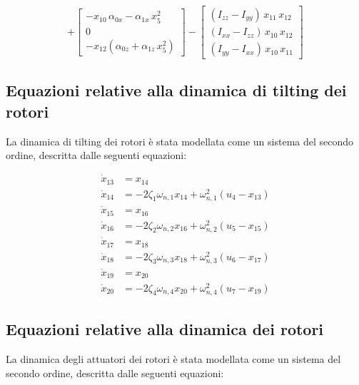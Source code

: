 \begin{equation}
+
\begin{bmatrix}
	- x_{10}\,\alpha_{0x} - \alpha_{1x}\,x_5^2 \\
	0 \\
	- x_{12}\left(\alpha_{0z} + \alpha_{1z}\,x_5^2\right)
\end{bmatrix}
-
\begin{bmatrix}
	(I_{zz}-I_{yy})\,x_{11}\,x_{12} \\
	(I_{xx}-I_{zz})\,x_{10}\,x_{12} \\
	(I_{yy}-I_{xx})\,x_{10}\,x_{11}
\end{bmatrix}
\end{equation}
	 

	  
\clearpage

\subsection{Equazioni relative alla dinamica di tilting dei rotori}
	\vspace{0.5cm}
La dinamica di tilting dei rotori è stata modellata come un sistema del secondo ordine, descritta dalle seguenti equazioni:

	\vspace{0.5cm}

\begin{align}
\dot{x}_{13} &= x_{14} \\[4pt]
\dot{x}_{14} &= -2 \zeta_1 \omega_{n,1} x_{14} + \omega_{n,1}^2 (u_4 - x_{13}) \\[6pt]
\dot{x}_{15} &= x_{16} \\[4pt]
\dot{x}_{16} &= -2 \zeta_2 \omega_{n,2} x_{16} + \omega_{n,2}^2 (u_5 - x_{15}) \\[6pt]
\dot{x}_{17} &= x_{18} \\[4pt]
\dot{x}_{18} &= -2 \zeta_3 \omega_{n,3} x_{18} + \omega_{n,3}^2 (u_6 - x_{17}) \\[6pt]
\dot{x}_{19} &= x_{20} \\[4pt]
\dot{x}_{20} &= -2 \zeta_4 \omega_{n,4} x_{20} + \omega_{n,4}^2 (u_7 - x_{19})
\end{align}
	  
\clearpage

	  
\subsection{Equazioni relative alla dinamica dei rotori}
\vspace{0.5cm}
La dinamica degli attuatori dei rotori è stata modellata come un sistema del secondo ordine, descritta dalle seguenti equazioni:

